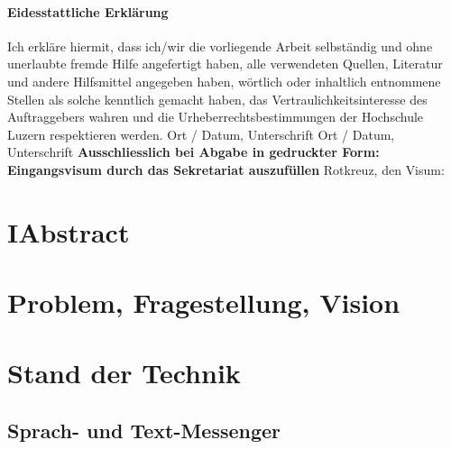 \documentclass[a4paper]{article}
\begin{document}
\paragraph{\textbf{Eidesstattliche Erkl\"arung}}
Ich erkl\"are hiermit, dass ich/wir die vorliegende Arbeit selbst\"andig und ohne unerlaubte fremde Hilfe angefertigt haben, alle verwendeten Quellen, Literatur und andere Hilfsmittel angegeben haben, w\"ortlich oder inhaltlich entnommene Stellen als solche kenntlich gemacht haben, das Vertraulichkeitsinteresse des Auftraggebers wahren und die Urheberrechtsbestimmungen der Hochschule Luzern respektieren werden. \newline \newline
Ort / Datum, Unterschrift	\underline{\hspace*{8cm}} \newline \newline
Ort / Datum, Unterschrift	\underline{\hspace*{8cm}} \newline \newline \newline
\textbf{Ausschliesslich bei Abgabe in gedruckter Form: \\
Eingangsvisum durch das Sekretariat auszuf\"ullen}\newline \newline
Rotkreuz, den	\underline{\hspace*{4cm}}	\hspace*{1cm} Visum:	\underline{\hspace*{4cm}}

\newpage
\section*{I{\hspace*{1cm}}Abstract}

\newpage

\tableofcontents
\newpage
\section{Problem, Fragestellung, Vision}


\section{Stand der Technik}

\subsection{Sprach- und Text-Messenger}
\end{document}
